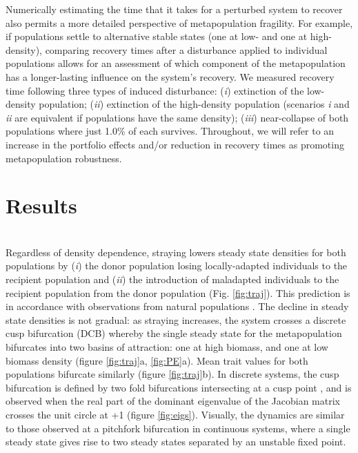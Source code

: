 \documentclass{revtex4}
\begin{document}
Numerically estimating the time that it takes for a perturbed system to recover also permits a more detailed perspective of metapopulation fragility.
For example, if populations settle to alternative stable states (one at low- and one at high-density), comparing recovery times after a disturbance applied to individual populations allows for an assessment of which component of the metapopulation has a longer-lasting influence on the system's recovery. %
We measured recovery time following three types of induced disturbance: (\emph{i}) extinction of the low-density population; (\emph{ii}) extinction of the high-density population (scenarios \emph{i} and \emph{ii} are equivalent if populations have the same density); (\emph{iii}) near-collapse of both populations where just 1.0\% of each survives.
Throughout, we will refer to an increase in the portfolio effects and/or reduction in recovery times as promoting metapopulation robustness.
\\


\section{Results}


 \\
\noindent Regardless of density dependence, straying lowers steady state densities for both populations by (\emph{i}) the donor population losing locally-adapted individuals to the recipient population and (\emph{ii}) the introduction of maladapted individuals to the recipient population from the donor population (Fig. \ref{fig:traj}).
This prediction is in accordance with observations from natural populations \citep{Bett:2017ha}. %
The decline in steady state densities is not gradual: as straying increases, the system crosses a discrete cusp bifurcation (DCB) \citep{AleksandrovichKuznetsov:1995p2580} whereby the single steady state for the metapopulation bifurcates into two basins of attraction: one at high biomass, and one at low biomass density (figure \ref{fig:traj}a, \ref{fig:PE}a).
Mean trait values for both populations bifurcate similarly (figure \ref{fig:traj}b). 
In discrete systems, the cusp bifurcation is defined by two fold bifurcations intersecting at a cusp point \citep{AleksandrovichKuznetsov:1995p2580}, and is observed when the real part of the dominant eigenvalue of the Jacobian matrix crosses the unit circle at +1 (figure \ref{fig:eigs}).
Visually, the dynamics are similar to those observed at a pitchfork bifurcation in continuous systems, where a single steady state gives rise to two steady states separated by an unstable fixed point.
\end{document}
